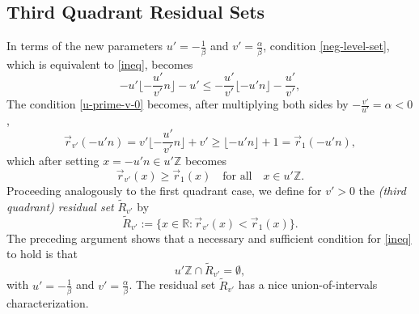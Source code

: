 \documentclass[12pt,letterpaper, reqno]{amsart}
\theoremstyle{definition}
\theoremstyle{remark}
\newcommand{\RR}{\ensuremath{\mathbb{R}}}
\newcommand{\ZZ}{\ensuremath{\mathbb{Z}}}
\newcommand{\uu}{{u'}}
\newcommand{\vv}{{v'}}
\newcommand{\R}{{R}}
\newcommand{\floor}[1]{\lfloor{#1}\rfloor}
\newcommand{\bfloor}[1]{\bigg\lfloor{#1}\bigg\rfloor}
\newcommand{\tround}{\vec{r}}
\begin{document}
\subsection{Third Quadrant Residual Sets} \label{sec51}

In terms of the new parameters $\uu= -\frac{1}{\beta}$ and $\vv= \frac{\alpha}{\beta}$, condition \eqref{neg-level-set}, which
is equivalent to \eqref{ineq}, becomes 
\begin{equation}\label{u-prime-v-0}
-{\uu} \bfloor{ -\frac{\uu}{\vv} n} -{\uu} \le -\frac{\uu}{\vv} \floor{ -{\uu} n} - \frac{\uu}{\vv},
\end{equation}
The condition \eqref{u-prime-v-0} becomes, after multiplying  both sides by $-\frac{\vv}{\uu}= {\alpha}<0$, 
$$
 \tround_\vv(-\uu n) = \vv\bfloor{ -\frac{\uu}{\vv} n}+\vv \ge \floor{ - {\uu} n } + 1 = \tround_1(-\uu n),
$$
which after setting $x= -{\uu}n \in {\uu}\ZZ$ becomes 
\begin{equation}\label{u-prime-v-1}
\tround_{\vv}( x) \ge \tround_{1} (x) \quad \mbox{for all} \quad x \in {\uu}\ZZ.
\end{equation}
Proceeding analogously to the first quadrant case, we define 
for $\vv >0$  the  {\em (third quadrant)  residual  set} $\widetilde{R}_\vv$ by
\[ 
\widetilde{R}_\vv := \{x \in\RR: \vec{r}_{\vv}(x)< \vec{r}_1(x)\}.
\]
The  preceding argument shows that  a necessary and sufficient condition for \eqref{ineq} to hold is that
\begin{equation}\label{u-prime-v-2} 
{\uu}\ZZ \cap \widetilde{\R}_\vv = \emptyset,
\end{equation}
with $\uu = -\frac{1}{\beta}$ and $\vv = \frac{\alpha}{\beta}$.
The residual set $\widetilde{R}_\vv$ has a nice union-of-intervals characterization.
\end{document}
